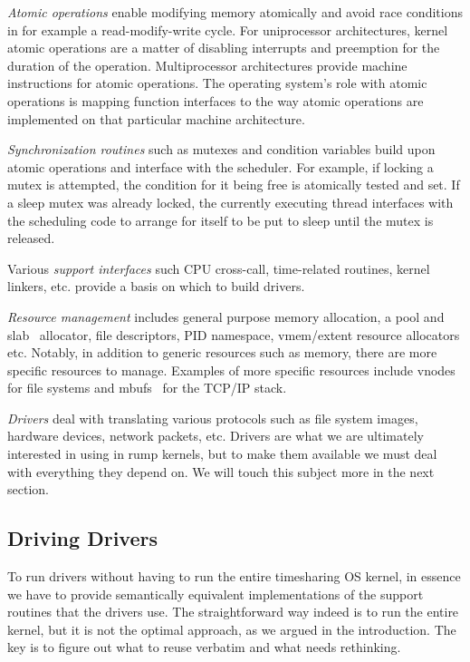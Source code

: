 \textit{Atomic operations} enable modifying memory atomically and
avoid race conditions in for example a read-modify-write cycle.
For uniprocessor architectures, kernel atomic operations are a matter of
disabling interrupts and preemption for the duration of the operation.
Multiprocessor architectures provide machine instructions for atomic
operations.  The operating system's role with atomic operations is mapping
function interfaces to the way atomic operations are implemented on that
particular machine architecture.

\textit{Synchronization routines} such as mutexes and condition
variables build upon atomic operations and interface with the scheduler.
For example, if locking a mutex is attempted, the condition for it being
free is atomically tested and set.  If a sleep mutex was already locked,
the currently executing thread interfaces with the scheduling code to
arrange for itself to be put to sleep until the mutex is released.

Various \textit{support interfaces} such CPU cross-call, time-related
routines, kernel linkers, etc. provide a basis on which to build drivers.

\textit{Resource management} includes general purpose memory
allocation, a pool and slab~\cite{bonwick:slab} allocator, file
descriptors, PID namespace, vmem/extent resource allocators etc.
Notably, in addition to generic resources such as memory,
there are more specific resources to manage.  Examples
of more specific resources include vnodes~\cite{kleiman:vnodes} for file
systems and mbufs~\cite{stevens:tcpip2} for the TCP/IP stack.

\textit{Drivers} deal with translating various protocols such as file
system images, hardware devices, network packets, etc.  Drivers are what
we are ultimately interested in using in rump kernels, but to make them
available we must deal with everything they depend on.
We will touch this subject more in the next section.

\subsection{Driving Drivers}

To run drivers without having to run the entire timesharing OS kernel, in essence we
have to provide semantically equivalent implementations of the support
routines that the drivers use.  The straightforward way indeed is to run
the entire kernel, but it is not the optimal approach, as we argued in
the introduction.  The key is to figure out what to reuse verbatim and
what needs rethinking.


